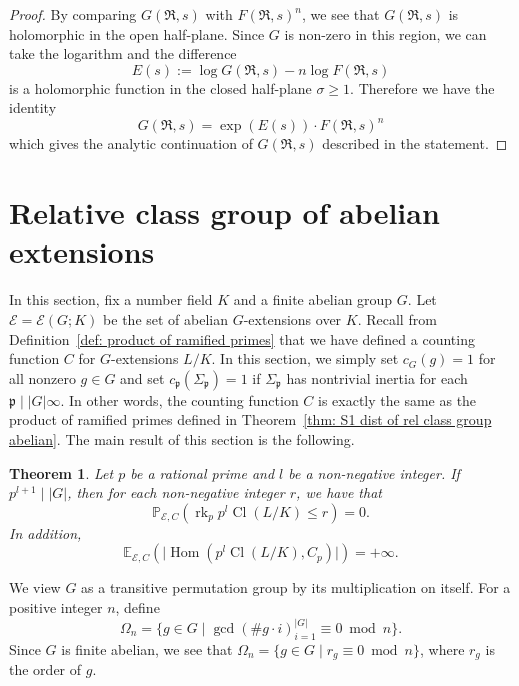 \documentclass{amsart}
\numberwithin{equation}{section}
\theoremstyle{plain}
\newtheorem{theorem}{Theorem}[section]
\theoremstyle{definition}
\theoremstyle{remark}
\begin{document}
\begin{proof}
	By comparing $G(\mathfrak{R},s)$ with $F(\mathfrak{R},s)^n$, we see that $G(\mathfrak{R},s)$ is holomorphic in the open half-plane.
	Since $G$ is non-zero in this region, we can take the logarithm and the difference
	\begin{equation*}
		E(s):=\log G(\mathfrak{R},s)-n\log F(\mathfrak{R},s)
	\end{equation*}
	is a holomorphic function in the closed half-plane $\sigma\geq1$.
	Therefore we have the identity
	\begin{equation*}
		G(\mathfrak{R},s)=\exp(E(s))\cdot F(\mathfrak{R},s)^n
	\end{equation*}
	which gives the analytic continuation of $G(\mathfrak{R},s)$ described in the statement.
\end{proof}


\section{Relative class group of abelian extensions}\label{section: abelian}
In this section, fix a number field $K$ and a finite abelian group $G$.
Let $\mathcal{E}=\mathcal{E}(G;K)$ be the set of abelian $G$-extensions over $K$.
Recall from Definition~\ref{def: product of ramified primes} that we have defined a counting function $C$ for $G$-extensions $L/K$.
In this section, we simply set $c_G(g)=1$ for all nonzero $g\in G$ and set $c_{\mathfrak{p}}(\Sigma_{\mathfrak{p}})=1$ if $\Sigma_{\mathfrak{p}}$ has nontrivial inertia for each $\mathfrak{p}\mid\lvert G\rvert\infty$.
In other words, the counting function $C$ is exactly the same as the product of ramified primes defined in Theorem~\ref{thm: S1 dist of rel class group abelian}.
The main result of this section is the following.
\begin{theorem}\label{thm: dist of rel class group abelian}
	Let $p$ be a rational prime and $l$ be a non-negative integer.
	If $p^{l+1}\mid\lvert G\rvert$, then for each non-negative integer $r$, we have that
	\begin{equation*}
		\mathbb{P}_{\mathcal{E},C}(\operatorname{rk}_p p^{l}\operatorname{Cl}(L/K)\leq r)=0.
	\end{equation*}
	In addition,
	\begin{equation*}
		\mathbb{E}_{\mathcal{E},C}(\lvert\operatorname{Hom}(p^{l}\operatorname{Cl}(L/K),C_p)\rvert)=+\infty.
	\end{equation*}
\end{theorem}
We view $G$ as a transitive permutation group by its multiplication on itself.
For a positive integer $n$, define
\begin{equation*}
	\Omega_{n}=\{g\in G\mid\gcd(\# g\cdot i)_{i=1}^{\lvert G\rvert}\equiv0\bmod{n}\}.
\end{equation*}
Since $G$ is finite abelian, we see that $\Omega_n=\{g\in G\mid r_g\equiv0\bmod{n}\}$, where $r_g$ is the order of $g$.
\end{document}
